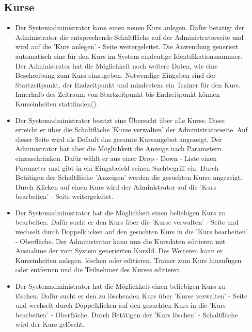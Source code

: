 \documentclass[a4paper]{scrreprt}
\begin{document}
\subsection{Kurse}
\begin{itemize}
	\item {}
	Der Systemadministrator kann einen neuen Kurs anlegen. Dafür betätigt der Administrator die entsprechende Schaltfläche auf der Administratorseite und wird auf die 'Kurs anlegen' - Seite weitergeleitet. Die Anwendung generiert automatisch eine für den Kurs im System eindeutige Identifikationsnummer. Der Administrator hat die Möglichkeit noch weitere Daten, wie eine Beschreibung zum Kurs einzugeben. Notwendige Eingaben sind der Startzeitpunkt, der Endzeitpunkt und mindestens ein Trainer für den Kurs. Innerhalb des Zeitraum von Startzeitpunkt bis Endzeitpunkt können Kurseinheiten stattfinden().
	\item {}
	Der Systemadministrator besitzt eine Übersicht über alle Kurse. Diese erreicht er über die Schaltfläche 'Kurse verwalten' der Administratorseite. Auf dieser Seite wird als Default das gesamte Kursangebot angezeigt. Der Administrator hat aber die Möglichkeit die Anzeige nach Parametern einzuschränken. Dafür wählt er aus einer Drop - Down - Liste einen Parameter und gibt in ein Eingabefeld seinen Suchbegriff ein. Durch Betätigen der Schaltfläche 'Anzeigen' werden die gesuchten Kurse angezeigt. Durch Klicken auf einen Kurs wird der Administrator auf die 'Kurs bearbeiten' - Seite weitergeleitet.
	\item {}
	Der Systemadministrator hat die Möglichkeit einen beliebigen Kurs zu bearbeiten. Dafür sucht er den Kurs über die 'Kurse verwalten' - Seite und wechselt durch Doppelklicken auf den gesuchten Kurs in die 'Kurs bearbeiten' - Oberfläche. Der Administrator kann nun die Kursdaten editieren mit Ausnahme der vom System generierten KursId. Des Weiteren kann er Kurseinheiten anlegen, löschen oder editieren, Trainer zum Kurs hinzufügen oder entfernen und die Teilnehmer des Kurses editieren.
	\item {}
	Der Systemadministrator hat die Möglichkeit einen beliebigen Kurs zu löschen. Dafür sucht er den zu löschenden Kurs über 'Kurse verwalten' - Seite und wechselt durch Doppelklicken auf den gesuchten Kurs in die 'Kurs bearbeiten' - Oberfläche. Durch Betätigen der 'Kurs löschen' - Schaltfläche wird der Kurs gelöscht.
\end{itemize}
\end{document}
